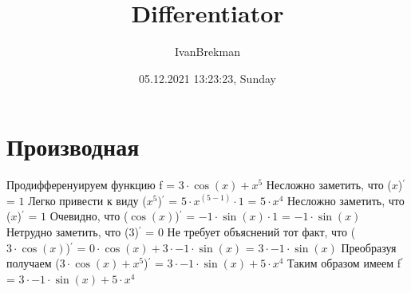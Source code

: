 \documentclass{article}
\title{Differentiator}
\author{IvanBrekman}
\date{05.12.2021 13:23:23, Sunday}
\begin{document}
\maketitle

\section {Производная}
Продифференуируем функцию f = $ 3 \cdot \cos{(x)} + {x}^{5} $\newline
Несложно заметить, что \newline
($ x $)$ ^\prime $ = $ 1 $\newline
\newline
Легко привести к виду \newline
($ {x}^{5} $)$ ^\prime $ = $ 5 \cdot {x}^{(5 - 1)} \cdot 1 $ = $ 5 \cdot {x}^{4} $\newline
\newline
Несложно заметить, что \newline
($ x $)$ ^\prime $ = $ 1 $\newline
\newline
Очевидно, что \newline
($ \cos{(x)} $)$ ^\prime $ = $ -1 \cdot \sin{(x)} \cdot 1 $ = $ -1 \cdot \sin{(x)} $\newline
\newline
Нетрудно заметить, что \newline
($ 3 $)$ ^\prime $ = $ 0 $\newline
\newline
Не требует объяснений тот факт, что \newline
($ 3 \cdot \cos{(x)} $)$ ^\prime $ = $ 0 \cdot \cos{(x)} + 3 \cdot -1 \cdot \sin{(x)} $ = $ 3 \cdot -1 \cdot \sin{(x)} $\newline
\newline
Преобразуя получаем \newline
($ 3 \cdot \cos{(x)} + {x}^{5} $)$ ^\prime $ = $ 3 \cdot -1 \cdot \sin{(x)} + 5 \cdot {x}^{4} $\newline
\newline
Таким образом имеем f$^\prime$ = $ 3 \cdot -1 \cdot \sin{(x)} + 5 \cdot {x}^{4} $
\end{document}
